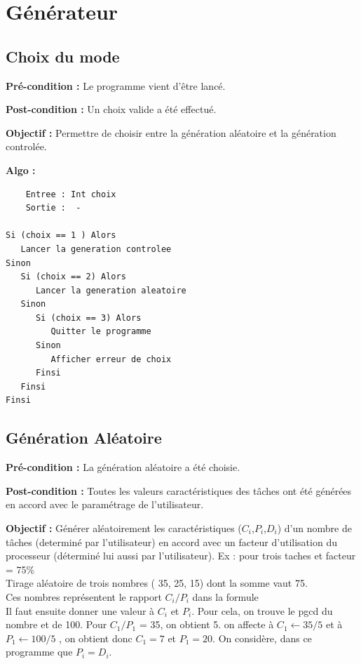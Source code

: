 	\section{Générateur}
		\subsection{Choix du mode}
			\textbf{Pré-condition :} Le programme vient d’être lancé.
			
			\textbf{Post-condition :} Un choix valide a été effectué.
			
			\textbf{Objectif :} Permettre de choisir entre la génération aléatoire et la génération controlée.
			
			\textbf{Algo :}
			\begin{lstlisting} 
	Entree : Int choix
	Sortie :  -

Si (choix == 1 ) Alors
   Lancer la generation controlee
Sinon
   Si (choix == 2) Alors
	  Lancer la generation aleatoire 
   Sinon
	  Si (choix == 3) Alors
	     Quitter le programme
	  Sinon
	     Afficher erreur de choix 
	  Finsi
   Finsi
Finsi
		\end{lstlisting} 

	\newpage
		\subsection{Génération Aléatoire}
			\textbf{Pré-condition :} La génération aléatoire a été choisie.
		
			\textbf{Post-condition :} Toutes les valeurs caractéristiques des tâches ont été générées en accord avec le paramétrage de l’utilisateur.

			\textbf{Objectif :} Générer aléatoirement les caractéristiques ($C_i$,$P_i$,$D_i$) d’un nombre de tâches (determiné par l’utilisateur) en accord avec un facteur d’utilisation du processeur (déterminé lui aussi par l’utilisateur).
			Ex : pour trois taches et facteur = 75\% \\ 


		    Tirage aléatoire de trois nombres ( 35, 25, 15) dont la somme vaut 75. \\
		    Ces nombres représentent le rapport $C_i/P_i$ dans la formule  \\
		    Il faut ensuite donner une valeur à $C_i$ et $P_i$. Pour cela, on trouve le pgcd du nombre et de 100. Pour $C_1/P_1$ = 35, on obtient 5.  on affecte à $C_1 \leftarrow 35/5$ et à $P_1 \leftarrow 100/5$ , on obtient donc $C_1 = 7$ et $P_1 = 20$. On considère, dans ce programme que $P_i = D_i$. \\
		    
